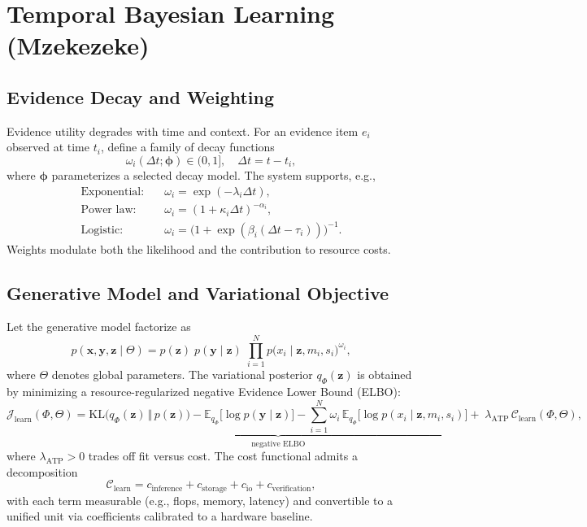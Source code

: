 \documentclass[12pt,a4paper]{article}
\begin{document}
\section{Temporal Bayesian Learning (Mzekezeke)}
\subsection{Evidence Decay and Weighting}
Evidence utility degrades with time and context. For an evidence item $e_i$ observed at time $t_i$, define a family of decay functions
\begin{equation}
\label{eq:decay}
\omega_i(\Delta t; \bm{\phi}) \in (0,1], \quad \Delta t = t - t_i,
\end{equation}
where $\bm{\phi}$ parameterizes a selected decay model. The system supports, e.g.,
\begin{align}
\text{Exponential:}\quad & \omega_i = \exp(-\lambda_i \Delta t), \\
\text{Power law:}\quad & \omega_i = (1 + \kappa_i \Delta t)^{-\alpha_i}, \\
\text{Logistic:}\quad & \omega_i = \bigl(1 + \exp(\beta_i(\Delta t - \tau_i))\bigr)^{-1}.
\end{align}
Weights modulate both the likelihood and the contribution to resource costs.

\subsection{Generative Model and Variational Objective}
Let the generative model factorize as
\begin{equation}
\label{eq:generative}
 p(\mathbf{x}, \mathbf{y}, \mathbf{z} \mid \Theta) = p(\mathbf{z}) \; p(\mathbf{y}\mid \mathbf{z}) \; \prod_{i=1}^{N} p\bigl(x_i \mid \mathbf{z}, m_i, s_i\bigr)^{\omega_i},
\end{equation}
where $\Theta$ denotes global parameters. The variational posterior $q_{\Phi}(\mathbf{z})$ is obtained by minimizing a resource-regularized negative Evidence Lower Bound (ELBO):
\begin{equation}
\label{eq:relbo}
\mathcal{J}_{\text{learn}}(\Phi,\Theta) = \underbrace{\mathrm{KL}\bigl(q_{\Phi}(\mathbf{z})\,\Vert\, p(\mathbf{z})\bigr) - \mathbb{E}_{q_{\Phi}}\bigl[\log p(\mathbf{y}\mid \mathbf{z})\bigr] - \sum_{i=1}^N \omega_i\, \mathbb{E}_{q_{\Phi}}\bigl[\log p(x_i \mid \mathbf{z}, m_i, s_i)\bigr]}_{\text{negative ELBO}} 
+ \; \lambda_{\text{ATP}} \, \mathcal{C}_{\text{learn}}(\Phi,\Theta),
\end{equation}
where $\lambda_{\text{ATP}}>0$ trades off fit versus cost. The cost functional admits a decomposition
\begin{equation}
\label{eq:cost}
\mathcal{C}_{\text{learn}} = c_{\text{inference}} + c_{\text{storage}} + c_{\text{io}} + c_{\text{verification}},
\end{equation}
with each term measurable (e.g., flops, memory, latency) and convertible to a unified unit via coefficients calibrated to a hardware baseline.
\end{document}
